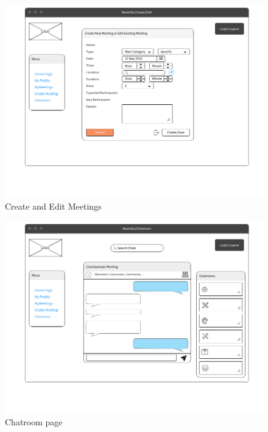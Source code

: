 \documentclass[conference]{IEEEtran}
\begin{document}
\begin{figure}
  \centering
  \includegraphics[scale=0.3]{pics/mockups/Create_edit.png}\quad
  \caption { Create and Edit Meetings}
\end{figure}

\begin{figure}
  \centering
  \includegraphics[scale=0.3]{pics/mockups/Chatroom.png}\quad
  \caption { Chatroom page}
\end{figure}
\end{document}
